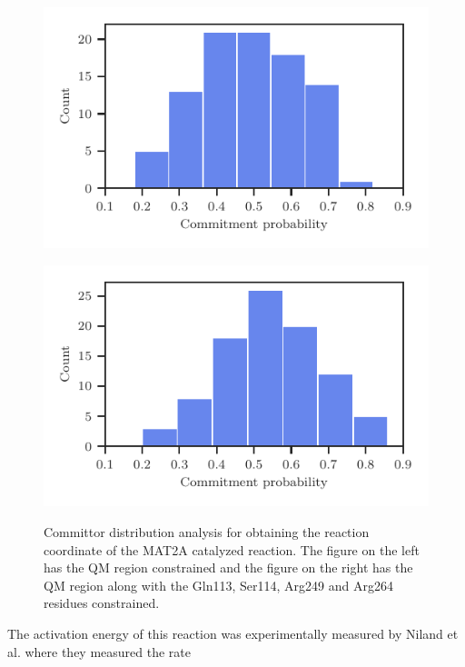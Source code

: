 \documentclass[journal=jpcbfk,manuscript=article,layout=traditional]{achemso}
\begin{document}
\begin{figure}[ht!]
\centering
\begin{minipage}[b]{0.45\linewidth}
\includegraphics[width=\textwidth]{figures/comm-60-mat2a-nocons.pdf}
\label{fig:minipage1}
\end{minipage}
\quad
\begin{minipage}[b]{0.45\linewidth}
\includegraphics[width=\textwidth]{figures/comm-60-mat2a.pdf}
\label{fig:minipage2}
\end{minipage}
\caption{Committor distribution analysis for obtaining the reaction coordinate of the 
MAT2A catalyzed reaction. The figure on the left has the QM region constrained and the figure 
on the right has the QM region along with the Gln113, Ser114, Arg249 and Arg264 residues constrained.}
\label{fig:mat2a-comm-dist}
\end{figure}
The activation energy of this reaction was experimentally measured by 
Niland et al. \cite{Niland21Biochem60p791} where they measured the rate 
\end{document}
